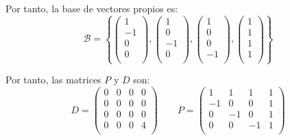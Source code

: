 \begin{ejercicio}
    Por tanto, la base de vectores propios es:
    \begin{equation*}
        \mathcal{B} = \left\{
        \left(\begin{array}{c}
                1 \\
                - 1 \\
                0 \\
                0 \\
           \end{array}\right),
           \left(\begin{array}{c}
                1 \\
                0 \\
                -1 \\
                0 \\
           \end{array}\right),
           \left(\begin{array}{c}
                1 \\
                0 \\
                0 \\
                -1 \\
           \end{array}\right),
           \left(\begin{array}{c}
                1 \\
                1 \\
                1 \\
                1 \\
           \end{array}\right)
        \right\}
    \end{equation*}

    Por tanto, las matrices $P$ y $D$ son:
    \begin{equation*}
        D = \left( \begin{array}{cccc}
            0 & 0 & 0 & 0 \\
            0 & 0 & 0 & 0 \\
            0 & 0 & 0 & 0 \\
            0 & 0 & 0 & 4 \\
        \end{array}\right) \qquad 
        P = \left( \begin{array}{cccc}
            1 & 1 & 1 & 1 \\
            -1 & 0 & 0 & 1 \\
            0& -1 & 0 & 1 \\
            0 & 0 & -1 & 1 \\
        \end{array}\right)
    \end{equation*}
\end{ejercicio}

